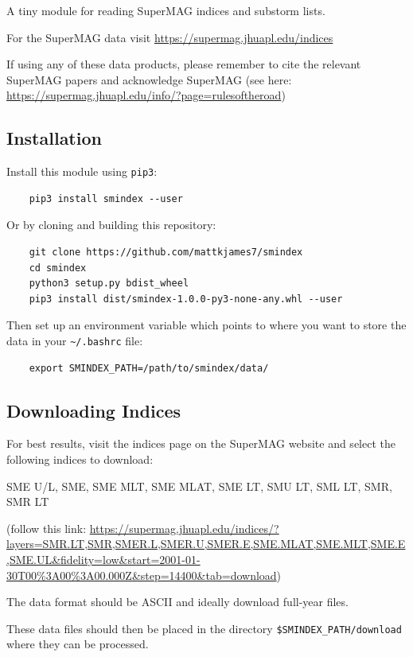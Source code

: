 	A tiny module for reading SuperMAG indices and substorm lists.

	For the SuperMAG data visit \url{https://supermag.jhuapl.edu/indices}
	
	If using any of these data products, please remember to cite the relevant SuperMAG papers and acknowledge SuperMAG (see here: \url{https://supermag.jhuapl.edu/info/?page=rulesoftheroad})
	
	\subsection{Installation}
	
	Install this module using \texttt{pip3}:
	
	\begin{verbatim}
	pip3 install smindex --user
	\end{verbatim}
	
	Or by cloning and building this repository:
	
	\begin{verbatim}
	git clone https://github.com/mattkjames7/smindex
	cd smindex
	python3 setup.py bdist_wheel
	pip3 install dist/smindex-1.0.0-py3-none-any.whl --user
	\end{verbatim}
	
	Then set up an environment variable which points to where you want to store the data in your \texttt{\~{}/.bashrc} file:
	
	\begin{verbatim}
	export SMINDEX_PATH=/path/to/smindex/data/
	\end{verbatim}
	
	\subsection{Downloading Indices}
	
	For best results, visit the indices page on the SuperMAG website and select the following indices to download:
	
	SME U/L, SME, SME MLT, SME MLAT, SME LT, SMU LT, SML LT, SMR, SMR LT
	
	(follow this link: \url{https://supermag.jhuapl.edu/indices/?layers=SMR.LT,SMR,SMER.L,SMER.U,SMER.E,SME.MLAT,SME.MLT,SME.E,SME.UL&fidelity=low&start=2001-01-30T00%3A00%3A00.000Z&step=14400&tab=download})
	
	The data format should be ASCII and ideally download full-year files.
	
	These data files should then be placed in the directory \texttt{\$SMINDEX_PATH/download} where they can be processed.
	
